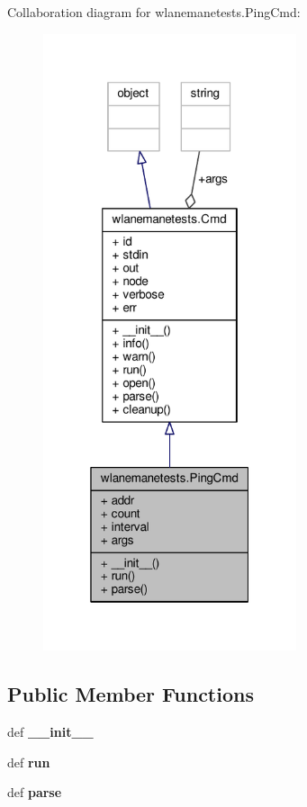 Collaboration diagram for wlanemanetests.\+Ping\+Cmd\+:
\nopagebreak
\begin{figure}[H]
\begin{center}
\leavevmode
\includegraphics[width=211pt]{classwlanemanetests_1_1_ping_cmd__coll__graph}
\end{center}
\end{figure}
\subsection*{Public Member Functions}
\begin{DoxyCompactItemize}
\item 
\hypertarget{classwlanemanetests_1_1_ping_cmd_aeb3d274caff5f5797501710b27ae830a}{def {\bfseries \+\_\+\+\_\+init\+\_\+\+\_\+}}\label{classwlanemanetests_1_1_ping_cmd_aeb3d274caff5f5797501710b27ae830a}

\item 
\hypertarget{classwlanemanetests_1_1_ping_cmd_a4eadbd147c6a650c8d62965886ab492f}{def {\bfseries run}}\label{classwlanemanetests_1_1_ping_cmd_a4eadbd147c6a650c8d62965886ab492f}

\item 
\hypertarget{classwlanemanetests_1_1_ping_cmd_afaf244d2b34f4ed8c8998a3b283f6c2e}{def {\bfseries parse}}\label{classwlanemanetests_1_1_ping_cmd_afaf244d2b34f4ed8c8998a3b283f6c2e}

\end{DoxyCompactItemize}
